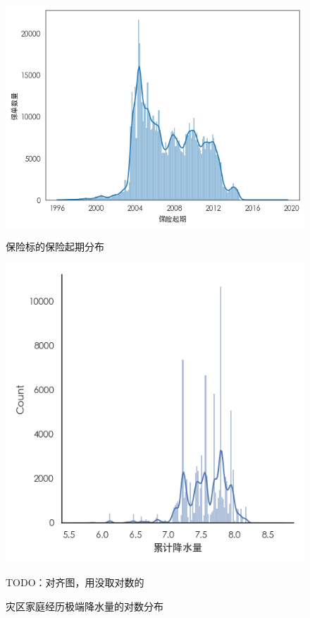 \begin{figure}[H]
    \begin{minipage}{0.48\linewidth}
        \includegraphics[width=\linewidth]{img/insurance.png}
        \caption{保险标的保险起期分布}
    \end{minipage}
    \begin{minipage}{0.48\linewidth}
        \includegraphics[width=\linewidth]{lib/img/precip.png}
        \caption{灾区家庭经历极端降水量的对数分布}
        TODO：对齐图，用没取对数的
    \end{minipage}
\end{figure}
%     

